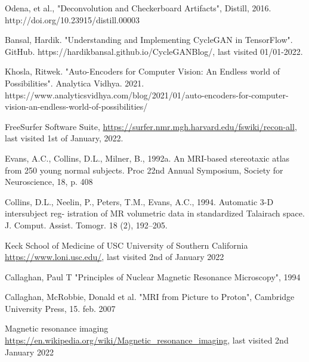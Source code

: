 \documentclass[12pt, fleqn, titlepage]{article}
\begin{document}
\begin{thebibliography}{9}
		 Odena, et al., "Deconvolution and Checkerboard Artifacts", Distill, 2016. http://doi.org/10.23915/distill.00003
		
		 Bansal, Hardik. "Understanding and Implementing CycleGAN in TensorFlow". GitHub. https://hardikbansal.github.io/CycleGANBlog/, last visited 01/01-2022.
		
		 Khosla, Ritwek. "Auto-Encoders for Computer Vision: An Endless world of Possibilities". Analytica Vidhya. 2021. https://www.analyticsvidhya.com/blog/2021/01/auto-encoders-for-computer-vision-an-endless-world-of-possibilities/

		 FreeSurfer Software Suite, \url{https://surfer.nmr.mgh.harvard.edu/fswiki/recon-all}, last visited 1st of January, 2022.
		
		 Evans, A.C., Collins, D.L., Milner, B., 1992a. An MRI-based stereotaxic atlas from 250 young normal subjects. Proc 22nd Annual Symposium, Society for Neuroscience, 18, p. 408
		
		 Collins, D.L., Neelin, P., Peters, T.M., Evans, A.C., 1994. Automatic 3-D intersubject reg- istration of MR volumetric data in standardized Talairach space. J. Comput. Assist. Tomogr. 18 (2), 192–205.
		
		 Keck School of Medicine of USC University of Southern California \url{https://www.loni.usc.edu/}, last visited 2nd of January 2022
		
		 Callaghan, Paul T "Principles of Nuclear
		Magnetic Resonance Microscopy", 1994
		
		 Callaghan, McRobbie, Donald et al. "MRI from Picture to Proton", Cambridge University Press, 15. feb. 2007
		
		 Magnetic resonance imaging \url{https://en.wikipedia.org/wiki/Magnetic_resonance_imaging}, last visited 2nd January 2022
		
	\end{thebibliography}
	
	
	\newpage
	
	
	
	
	
	
\end{document}
